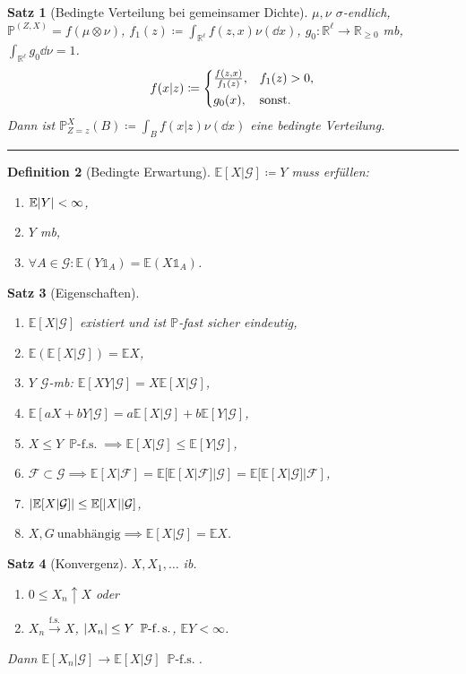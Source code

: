 \documentclass[a4paper,8pt]{article}
\newcounter{Sec}
\theoremstyle{nonumberbreak}
\newtheorem{definition}{Definition}[Sec]
\newtheorem{satz}[definition]{Satz}
\newcommand{\sep}{%
	\rule{\linewidth}{0.15pt}%
	\stepcounter{Sec}%
	}
\newcommand{\defas}{\coloneqq}
\newcommand{\ind}{\mathds{1}}
\renewcommand{\P}{\mathbb{P}}
\newcommand{\R}{\mathbb{R}}
\newcommand{\E}{\mathbb{E}}
\newcommand{\EV}[2]{\E[#1|#2]}
\newcommand{\BE}[2]{\EV{#1}{\mathcal{#2}}}
\newcommand{\fsk}{\mathrel{\stackrel{\operatorname{f.s.}}{\longrightarrow}}}
\newcommand{\fs}[1]{~\operatorname{#1-f.s.}}
\begin{document}
\begin{multicols*}{3}
\begin{satz}[Bedingte Verteilung bei gemeinsamer Dichte]
		$\mu, \nu$ $\sigma$-endlich, $\P^{(Z, X)}=f(\mu\otimes\nu)$, $f_1(z)\defas\int_{\R^\ell}f(z, x)\nu(\dd{x})$,
		$g_0\colon\R^\ell\to\R_{\geq0}$ mb, $\int_{\R^\ell}g_0\dd{\nu}=1$.
		\[
			f(x|z)\defas\begin{cases*}
				\frac{f(z, x)}{f_1(z)}, &$f_1(z)>0$,\\
				g_0(x), &sonst.
			\end{cases*}
		\]
		Dann ist $\P^X_{Z=z}(B)\defas\int_Bf(x|z)\nu(\dd{x})$ eine bedingte Verteilung.
	\end{satz}
	\sep
	\begin{definition}[Bedingte Erwartung]
		$\BE{X}{G}\defas Y$ muss erfüllen:
		\begin{enumerate}[label=(\alph*)]
			\item $\E\abs{Y}<\infty$,
			\item $Y$ mb,
			\item $\forall A\in\mathcal{G}:\E(Y\ind_A)=\E(X\ind_A)$.
		\end{enumerate}
	\end{definition}
	\begin{satz}[Eigenschaften]
		\begin{enumerate}[label=(\alph*)]
			\item $\BE{X}{G}$ existiert und ist $\P$-fast sicher eindeutig,
			\item $\E(\BE{X}{G})=\E X$,
			\item $Y$ $\mathcal{G}$-mb: $\BE{XY}{G}=X\BE{X}{G}$,
			\item $\BE{aX+bY}{G}=a\BE{X}{G}+b\BE{Y}{G}$,
			\item $X\leq Y\fs{\P}\implies\BE{X}{G}\leq\BE{Y}{G}$,
			\item $\mathcal{F}\subset\mathcal{G}\implies \BE{X}{F}=\BE{\BE{X}{F}}{G}=\BE{\BE{X}{G}}{F}$,
			\item $\abs{\BE{X}{G}}\leq\BE{\abs{X}}{G}$,
			\item $X, G~\text{unabhängig}\implies\BE{X}{G}=\E X$.
		\end{enumerate}
	\end{satz}
	\begin{satz}[Konvergenz]
		$X, X_1,\ldots$ ib.
		\begin{enumerate}[label=(\alph*)]
			\item $0\leq X_n\uparrow X$ oder
			\item $X_n\fsk X$, $\abs{X_n}\leq Y\fs{\P}$, $\E Y<\infty$.
		\end{enumerate}
		Dann $\BE{X_n}{G}\to\BE{X}{G}\fs{\P}$.
	\end{satz}

\end{multicols*}
\end{document}
